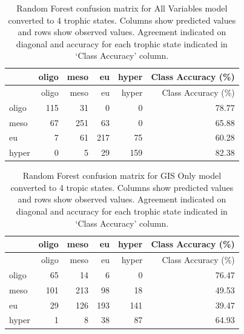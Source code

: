 \documentclass[11pt,]{article}
\begin{document}
\newpage

\begin{longtable}[c]{@{}lrrrrr@{}}
\caption{Random Forest confusion matrix for All Variables model
converted to 4 trophic states. Columns show predicted values and rows
show observed values. Agreement indicated on diagonal and accuracy for
each trophic state indicated in `Class Accuracy' column.
\label{tab:Confusion_All_4}}\tabularnewline
\toprule
& oligo & meso & eu & hyper & Class Accuracy (\%)\tabularnewline
\midrule
\endfirsthead
\toprule
& oligo & meso & eu & hyper & Class Accuracy (\%)\tabularnewline
\midrule
\endhead
oligo & 115 & 31 & 0 & 0 & 78.77\tabularnewline
meso & 67 & 251 & 63 & 0 & 65.88\tabularnewline
eu & 7 & 61 & 217 & 75 & 60.28\tabularnewline
hyper & 0 & 5 & 29 & 159 & 82.38\tabularnewline
\bottomrule
\end{longtable}

\newpage

\begin{longtable}[c]{@{}lrrrrr@{}}
\caption{Random Forest confusion matrix for GIS Only model converted to
4 tropic states. Columns show predicted values and rows show observed
values. Agreement indicated on diagonal and accuracy for each trophic
state indicated in `Class Accuracy' column.
\label{tab:Confusion_GIS_4}}\tabularnewline
\toprule
& oligo & meso & eu & hyper & Class Accuracy (\%)\tabularnewline
\midrule
\endfirsthead
\toprule
& oligo & meso & eu & hyper & Class Accuracy (\%)\tabularnewline
\midrule
\endhead
oligo & 65 & 14 & 6 & 0 & 76.47\tabularnewline
meso & 101 & 213 & 98 & 18 & 49.53\tabularnewline
eu & 29 & 126 & 193 & 141 & 39.47\tabularnewline
hyper & 1 & 8 & 38 & 87 & 64.93\tabularnewline
\bottomrule
\end{longtable}

\newpage
\end{document}
